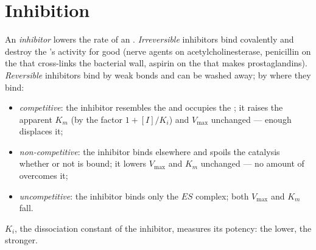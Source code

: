 \section{Inhibition}

\begin{definition}[Inhibitors]\label{def:b1:enzymes:inhibitors}
An \emph{inhibitor} lowers the rate of an
. \emph{Irreversible} inhibitors bind covalently and destroy the
's activity for good (nerve agents on acetylcholinesterase,
penicillin on the  that cross-links the bacterial wall, aspirin
on the  that makes prostaglandins). \emph{Reversible} inhibitors
bind by weak bonds and can be washed away; by where they bind:
\begin{itemize}
  \item \emph{competitive}: the inhibitor
        resembles the  and occupies the ; it
        raises the apparent $K_m$ (by the factor $1 + [I]/K_i$) and
         $V_{\max}$ unchanged --- enough  displaces it;
  \item \emph{non-competitive}: the inhibitor binds elsewhere and
        spoils the catalysis whether or not  is bound; it
        lowers $V_{\max}$ and  $K_m$ unchanged --- no amount of
         overcomes it;
  \item \emph{uncompetitive}: the inhibitor binds only the $ES$
        complex; both $V_{\max}$ and $K_m$ fall.
\end{itemize}
$K_i$, the dissociation constant of the inhibitor, measures its
potency: the lower, the stronger.
\end{definition}

